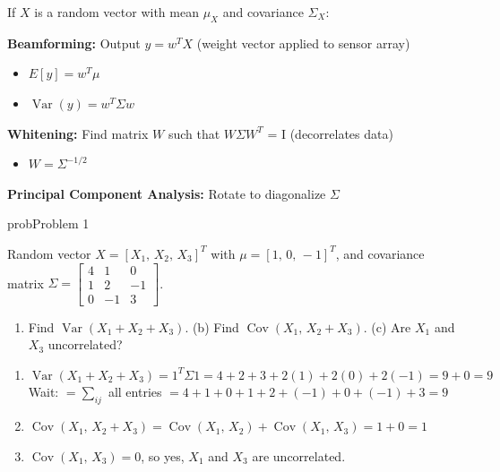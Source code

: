 

If $X$ is a random vector with mean $\mu_{X}$ and covariance $\Sigma_{X}$:



\textbf{Beamforming:} Output $y = w^{T}X$ (weight vector applied to sensor array)

\begin{itemize}
\tightlist
\item
  $E[y] = w^{T}\mu$
\item
  $\operatorname{Var}(y) = w^{T}\Sigma w$
\end{itemize}

\textbf{Whitening:} Find matrix $W$ such that $W\Sigma W^{T}$ = I (decorrelates data)

\begin{itemize}
\tightlist
\item
  $W = \Sigma^{-1/2}$
\end{itemize}

\textbf{Principal Component Analysis:} Rotate to diagonalize $\Sigma$


\begin{PSbox}[unbreakable]{prob}{Problem 1}

Random vector $X = [X_{1},\, X_{2},\, X_{3}]^{T}$ with $\mu = [1,\, 0,\, -1]^{T}$, and covariance matrix $\Sigma = \begin{bmatrix} 4 & 1 & 0 \\ 1 & 2 & -1 \\ 0 & -1 & 3 \end{bmatrix}$.

\begin{enumerate}
\def\labelenumi{(\alph{enumi})}
\tightlist
\item
  Find $\operatorname{Var}(X_{1} + X_{2} + X_{3})$. (b) Find $\operatorname{Cov}(X_{1},\, X_{2}+X_{3})$. (c) Are $X_{1}$ and $X_{3}$ uncorrelated?
\end{enumerate}

\PSsolution{} 

\begin{enumerate}
\def\labelenumi{(\alph{enumi})}
\tightlist
\item
  $\operatorname{Var}(X_{1}+X_{2}+X_{3}) = 1^{T}\Sigma 1 = 4+2+3 + 2(1) + 2(0) + 2(-1) = 9 + 0 = 9$\PSbr{}Wait: $= \sum_{ij}$ all entries $= 4+1+0+1+2+(-1)+0+(-1)+3 = 9$
\item
  $\operatorname{Cov}(X_{1},\, X_{2}+X_{3}) = \operatorname{Cov}(X_{1},\,X_{2}) + \operatorname{Cov}(X_{1},\,X_{3}) = 1 + 0 = 1$
\item
  $\operatorname{Cov}(X_{1},\,X_{3}) = 0$, so yes, $X_{1}$ and $X_{3}$ are uncorrelated.
\end{enumerate}

\end{PSbox}

